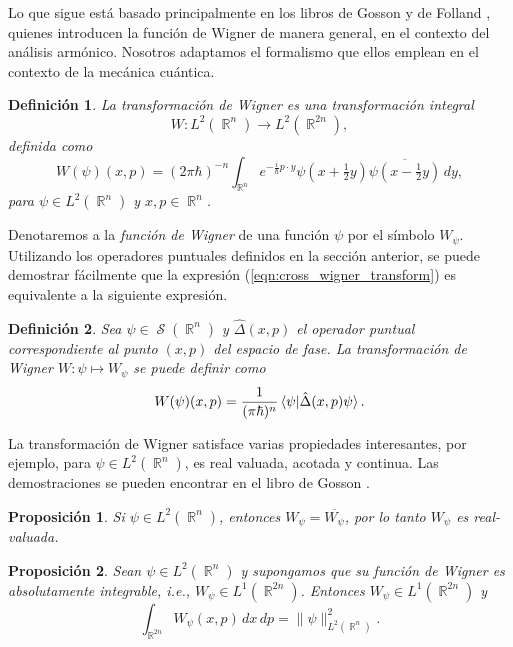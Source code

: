 \documentclass[a4paper,11pt]{report}
\DeclareMathOperator{\R}{\mathbb{R}}
\DeclareMathOperator{\Sz}{\mathcal S}
\newtheorem{definition}{Definición}
\newtheorem{proposition}{Proposición}
\begin{document}
  Lo que sigue está basado principalmente en los libros de
  Gosson \cite{gosson2017} y de Folland \cite{folland1989},
  quienes introducen la función de Wigner de manera general,
  en el contexto del análisis armónico. Nosotros adaptamos
  el formalismo que ellos emplean en el contexto de la
  mecánica cuántica.
  \begin{definition}
    La transformación de Wigner es una transformación
    integral
    \begin{equation}
      W : L^2(\R^{n}) \to L^2(\R^{2n}),
    \end{equation}
    definida como
    \begin{equation}
      \label{eqn:cross_wigner_transform}
      W(\psi)(x,p)
      = (2\pi\hbar)^{-n} \int_{\R^{n}} e^{-\frac{i}{\hbar} p
      \cdot y} \psi(x + \tfrac{1}{2}y) \overline{\psi(x -
      \tfrac{1}{2}y)} \, dy,
    \end{equation}
    para $\psi \in L^2(\R^{n})$ y $x,p \in \R^{n}$.  
  \end{definition} 
  Denotaremos a la \textit{función de Wigner} de una función
  $\psi$ por el símbolo $W_\psi$. Utilizando los operadores
  puntuales definidos en la sección anterior, se puede
  demostrar fácilmente que la expresión
  (\ref{eqn:cross_wigner_transform}) es equivalente a la
  siguiente expresión.
  \begin{definition}
    Sea $\psi \in \Sz(\R^{n})$ y $\hat\Delta(x,p)$ el
    operador puntual correspondiente al punto $(x,p)$ del
    espacio de fase. La transformación de Wigner $W : \psi
    \mapsto W_\psi$ se puede definir como
    \begin{equation}
      \label{eqn:def_wigner}
      W(\psi)(x,p)
      = \frac{1}{(\pi\hbar)^{n}} \braket{\psi|
      \hat{\Delta}(x,p)\psi}.
    \end{equation}
  \end{definition}
  La transformación de Wigner satisface varias propiedades
  interesantes, por ejemplo, para $\psi \in L^2(\R^{n})$, es
  real valuada, acotada y continua. Las demostraciones se
  pueden encontrar en el libro de Gosson \cite{degosson2016}.
  \begin{proposition}
    Si $\psi \in L^2(\R^{n})$, entonces $W_\psi =
    \overline{W_\psi}$, por lo tanto $W_\psi$ es
    real-valuada. 
  \end{proposition}
  \begin{proposition}
    Sean $\psi \in L^2(\R^{n})$ y supongamos que su función
    de Wigner es absolutamente integrable, i.e., $W_\psi \in
    L^{1}(\R^{2n})$. Entonces $W_\psi \in L^{1}(\R^{2n})$ y
    \begin{equation}
      \int_{\R^{2n}} W_\psi(x,p) \, dx \, dp 
      = \|\psi\|^2_{L^2(\R^{n})}.
    \end{equation}
  \end{proposition}
\end{document}
